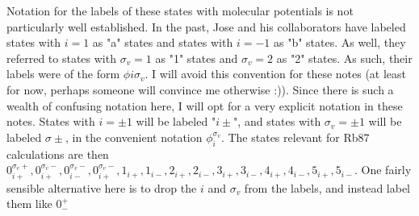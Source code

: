 \documentclass[prl, longbibliography]{revtex4-2}
\begin{document}
Notation for the labels of these states with molecular potentials is not particularly well established. In the past, Jose and his collaborators have labeled states with $i=1$ as "a" states and states with $i=-1$ as "b" states. As well, they referred to states with $\sigma_v=1$ as "1" states and $\sigma_v=2$ as "2" states. As such, their labels were of the form $\phi i \sigma_v$. I will avoid this convention for these notes (at least for now, perhaps someone will convince me otherwise :)). Since there is such a wealth of confusing notation here, I will opt for a very explicit notation in these notes. States with $i=\pm 1$ will be labeled "$i\pm$", and states with $\sigma_v=\pm1$ will be labeled $\sigma\pm$, in the convenient notation $\phi_i^{\sigma_v}$. The states relevant for Rb87 calculations are then $0_{i+}^{\sigma_v+},0_{i+}^{\sigma_v-},0_{i-}^{\sigma_v-},0_{i+}^{\sigma_v-}, 1_{i+},1_{i-},2_{i+},2_{i-},3_{i+},3_{i-},4_{i+},4_{i-},5_{i+},5_{i-}$. One fairly sensible alternative here is to drop the $i$ and $\sigma_v$ from the labels, and instead label them like $0^+_-$
\end{document}
